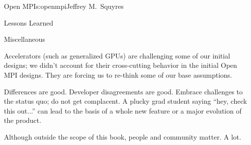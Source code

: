 \begin{aosachapter}{Open MPI}{s:openmpi}{Jeffrey M.\ Squyres}
\begin{aosasect1}{Lessons Learned}
\begin{aosasect2}{Miscellaneous}
\begin{aosaitemize}
\item Accelerators (such as generalized GPUs) are challenging some of
  our initial designs; we didn't account for their cross-cutting
  behavior in the initial Open MPI designs.  They are forcing us to
  re-think some of our base assumptions.

\item Differences are good.  Developer disagreements are good.
  Embrace challenges to the status quo; do not get complacent.  A
  plucky grad student saying ``hey, check this out...'' can lead to
  the basis of a whole new feature or a major evolution of the
  product.

\item Although outside the scope of this book, people and community
  matter.  A lot.

\end{aosaitemize}

\end{aosasect2}

\end{aosasect1}

\end{aosachapter}

